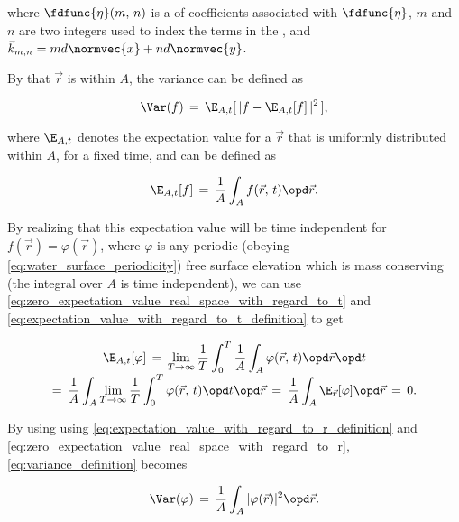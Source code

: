 {where $\fdfunc{\eta}(m,\,n)$ is a \twodimensional \sequence of coefficients associated with $\fdfunc{\eta}$, $m$ and $n$ are two integers used to index the terms in the \series, and $\vec{k}_{m,n} = md\normvec{x} + nd\normvec{y}$.

By \assuming that $\vec{r}$ is  within $A$, the variance can be defined as

\begin{equation} \label{eq:variance_definition}
\Var(f) \,=\, \E_{A,t}[\,|f - \E_{A,t}[f]\,|^2\,],
\end{equation}

where $\E_{A,t}$ denotes the expectation value for a $\vec{r}$ that is uniformly distributed within $A$, for a fixed time, and can be defined as

\begin{equation} \label{eq:expectation_value_with_regard_to_r_definition}
\E_{A,t}[f] \,=\, \frac{1}{A}\int_A f(\vec{r},\,t)\opd\vec{r}.
\end{equation}

By realizing that this expectation value will be time independent for $f(\vec{r}) = \varphi(\vec{r})$, where $\varphi$ is any periodic (obeying \eqref{eq:water_surface_periodicity}) free surface elevation which is mass conserving (the integral over $A$ is time independent), we can use \eqref{eq:zero_expectation_value_real_space_with_regard_to_t} and \eqref{eq:expectation_value_with_regard_to_t_definition} to get

\begin{equation} \label{eq:zero_expectation_value_real_space_with_regard_to_r}
\renewcommand*{\arraystretch}{2}
\begin{array}{c}
\displaystyle \E_{A,t}[\varphi] \,=\, \lim_{T\to\infty}\frac{1}{T}\int_0^T\frac{1}{A}\int_A \varphi(\vec{r},\,t)\opd\vec{r}\opd t \\
\displaystyle =\, \frac{1}{A}\int_A\lim_{T\to\infty}\frac{1}{T}\int_0^T \varphi(\vec{r},\,t)\opd t\opd\vec{r} \,=\, \frac{1}{A}\int_A \E_{\vec{r}}[\varphi]\opd\vec{r} \,=\, 0.
\end{array}
\end{equation}

By using using \eqref{eq:expectation_value_with_regard_to_r_definition} and \eqref{eq:zero_expectation_value_real_space_with_regard_to_r}, \eqref{eq:variance_definition} becomes

\begin{equation} \label{eq:variance_integral}
\Var(\varphi) \,=\, \frac{1}{A}\int_A|\varphi(\vec{r})|^2\opd\vec{r}.
\end{equation}

}
